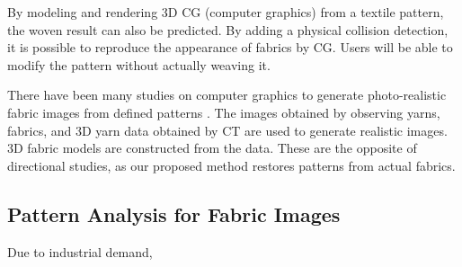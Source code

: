 By modeling and rendering 3D CG (computer graphics) from a textile pattern, the woven result can also be predicted. By adding a physical collision detection, it is possible to reproduce the appearance of fabrics by CG. Users will be able to modify the pattern without actually weaving it.  

% 
There have been many studies on computer graphics to generate photo-realistic fabric images from defined patterns \cite{Dobashi19,Leaf14,Sadeghi13,Zhao16}. The images obtained by observing yarns, fabrics, and 3D yarn data obtained by CT are used to generate realistic images. 3D fabric models are constructed from the data. These are the opposite of directional studies, as our proposed method restores patterns from actual fabrics. 

\subsection{Pattern Analysis for Fabric Images}
Due to industrial demand, 

